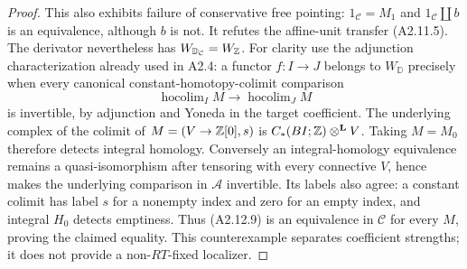 \begin{proof}
This also exhibits failure of conservative free pointing:
$1_{\mathcal C}=M_1$ and $1_{\mathcal C}\amalg b$ is an equivalence,
although $b$ is not. It refutes the affine-unit transfer (A2.11.5).
The derivator nevertheless has $W_{\mathbb D_{\mathcal C}}=W_{\mathbb Z}$.
For clarity use the adjunction characterization already used in A2.4:
a functor $f:I\to J$ belongs to $W_{\mathbb D}$ precisely when every
canonical constant-homotopy-colimit comparison
\[
 \operatorname{hocolim}_{I}M\longrightarrow
 \operatorname{hocolim}_{J}M
 \tag{A2.12.9}
\]
is invertible, by adjunction and Yoneda in the target coefficient.
The underlying complex of the colimit of $M=(V\to\mathbb Z[0],s)$ is
$C_*(BI;\mathbb Z)\otimes^{\mathbf L}V$. Taking $M=M_0$ therefore detects
integral homology. Conversely an integral-homology equivalence remains
a quasi-isomorphism after tensoring with every connective $V$, hence
makes the underlying comparison in $\mathcal A$ invertible. Its labels
also agree: a constant colimit has label $s$ for a nonempty index and
zero for an empty index, and integral $H_0$ detects emptiness. Thus
(A2.12.9) is an equivalence in $\mathcal C$ for every $M$, proving the
claimed equality. This counterexample separates coefficient strengths;
it does not provide a non-$RT$-fixed localizer.
\end{proof}


